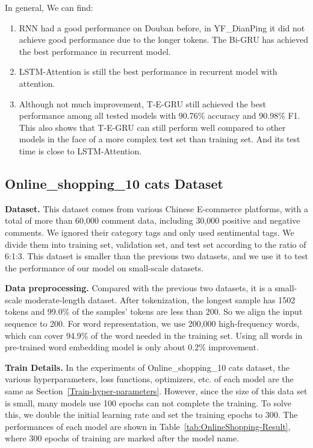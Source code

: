 In general, We can find:
\begin{enumerate}
    \item RNN had a good performance on Douban before, in YF\_DianPing it did not achieve good performance due to the longer tokens. The Bi-GRU has achieved the best performance in recurrent model.
    \item LSTM-Attention is still the best performance in recurrent model with attention.
    \item Although not much improvement, T-E-GRU still achieved the best performance among all tested models with 90.76\% accuracy and 90.98\% F1. This also shows that T-E-GRU can still perform well compared to other models in the face of a more complex test set than training set. And its test time is close to LSTM-Attention.
\end{enumerate}

\subsection{Online\_shopping\_10 cats Dataset}
\label{sec:online_shopping}

\textbf{Dataset.}
This dataset comes from various Chinese E-commerce platforms, with a total of more than 60,000 comment data, including 30,000 positive and negative comments. We ignored their category tags and only used sentimental tags. We divide them into training set, validation set, and test set according to the ratio of 6:1:3. This dataset is smaller than the previous two datasets, and we use it to test the performance of our model on small-scale datasets.

\textbf{Data preprocessing.}
Compared with the previous two datasets, it is a small-scale moderate-length dataset. After tokenization, the longest sample has 1502 tokens and 99.0\% of the samples' tokens are less than 200. So we align the input sequence to 200. For word representation, we use 200,000 high-frequency words, which can cover 94.9\% of the word needed in the training set. Using all words in pre-trained word embedding model is only about 0.2\% improvement. 

\textbf{Train Details.}
In the experiments of Online\_shopping\_10 cats dataset, the various hyperparameters, loss functions, optimizers, etc. of each model are the same as Section~\ref{Train-hyper-parameters}. However, since the size of this data set is small, many models use 100 epochs can not complete the training. To solve this, we double the initial learning rate and set the training epochs to 300. The performances of each model are shown in Table~\ref{tab:OnlineShopping-Result}, where 300 epochs of training are marked after the model name.

